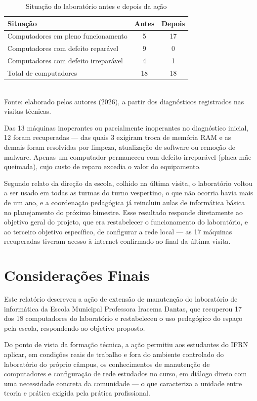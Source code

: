 \documentclass[article,12pt,a4paper,oneside]{abntex2}
\begin{document}
\begin{table}[!ht]
  \centering
  \caption{Situação do laboratório antes e depois da ação}
  \label{tab:resultados-ext}
  \begin{tabular}{lcc}
    \hline
    Situação & Antes & Depois \\
    \hline
    Computadores em pleno funcionamento & 5 & 17 \\
    Computadores com defeito reparável  & 9 & 0  \\
    Computadores com defeito irreparável & 4 & 1  \\
    Total de computadores & 18 & 18 \\
    \hline
  \end{tabular}
  \\[0.3em]
  {\footnotesize Fonte: elaborado pelos autores (2026), a partir dos diagnósticos registrados nas visitas técnicas.}
\end{table}

Das 13 máquinas inoperantes ou parcialmente inoperantes no diagnóstico
inicial, 12 foram recuperadas — das quais 3 exigiram troca de memória RAM
e as demais foram resolvidas por limpeza, atualização de software ou
remoção de malware. Apenas um computador permaneceu com defeito
irreparável (placa-mãe queimada), cujo custo de reparo excedia o valor do
equipamento.

Segundo relato da direção da escola, colhido na última visita, o
laboratório voltou a ser usado em todas as turmas do turno vespertino, o
que não ocorria havia mais de um ano, e a coordenação pedagógica já
reincluiu aulas de informática básica no planejamento do próximo bimestre.
Esse resultado responde diretamente ao objetivo geral do projeto, que era
restabelecer o funcionamento do laboratório, e ao terceiro objetivo
específico, de configurar a rede local — as 17 máquinas recuperadas
tiveram acesso à internet confirmado ao final da última visita.

\section{Considerações Finais}

Este relatório descreveu a ação de extensão de manutenção do laboratório
de informática da Escola Municipal Professora Iracema Dantas, que
recuperou 17 dos 18 computadores do laboratório e restabeleceu o uso
pedagógico do espaço pela escola, respondendo ao objetivo proposto.

Do ponto de vista da formação técnica, a ação permitiu aos estudantes do
IFRN aplicar, em condições reais de trabalho e fora do ambiente controlado
do laboratório do próprio câmpus, os conhecimentos de manutenção de
computadores e configuração de rede estudados no curso, em diálogo direto
com uma necessidade concreta da comunidade — o que caracteriza a unidade
entre teoria e prática exigida pela prática profissional.
\end{document}

